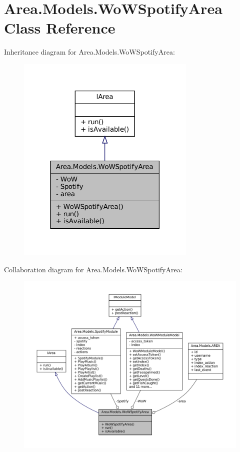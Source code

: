 \hypertarget{classArea_1_1Models_1_1WoWSpotifyArea}{}\section{Area.\+Models.\+Wo\+W\+Spotify\+Area Class Reference}
\label{classArea_1_1Models_1_1WoWSpotifyArea}


Inheritance diagram for Area.\+Models.\+Wo\+W\+Spotify\+Area\+:
\nopagebreak
\begin{figure}[H]
\begin{center}
\leavevmode
\includegraphics[width=243pt]{classArea_1_1Models_1_1WoWSpotifyArea__inherit__graph}
\end{center}
\end{figure}


Collaboration diagram for Area.\+Models.\+Wo\+W\+Spotify\+Area\+:
\nopagebreak
\begin{figure}[H]
\begin{center}
\leavevmode
\includegraphics[width=350pt]{classArea_1_1Models_1_1WoWSpotifyArea__coll__graph}
\end{center}
\end{figure}

